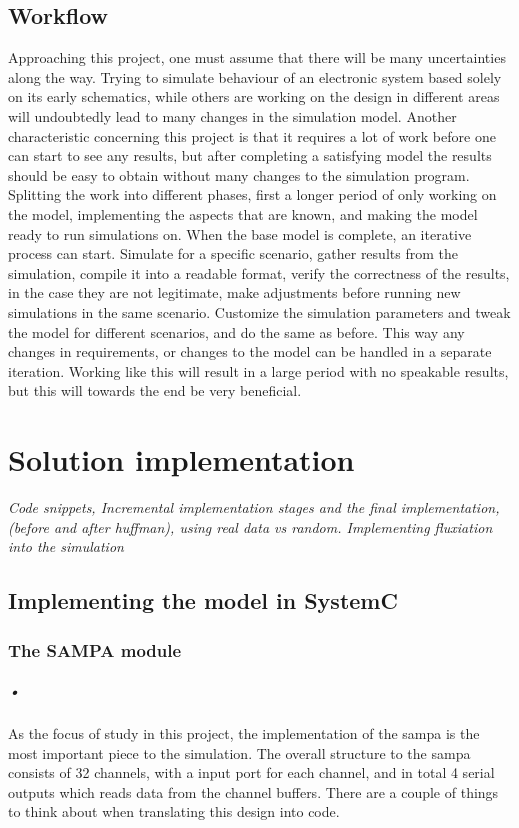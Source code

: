 \documentclass[a4paper, 12pt]{report}
\begin{document}
\section{Workflow}
Approaching this project, one must assume that there will be many uncertainties along the way.
Trying to simulate behaviour of an electronic system based solely on its early schematics, while others are working on the design in different areas will undoubtedly lead to many changes in the simulation model.
Another characteristic concerning this project is that it requires a lot of work before one can start to see any results, but after completing a satisfying  model the results should be easy to obtain without many changes to the simulation program.
Splitting the work into different phases, first a longer period of only working on the model, implementing the aspects that are known, and making the model ready to run simulations on.
When the base model is complete, an iterative process can start.
Simulate for a specific scenario, gather results from the simulation, compile it into a readable format, verify the correctness of the results, in the case they are not legitimate, make adjustments before running new simulations in the same scenario.
Customize the simulation parameters and tweak the model for different scenarios, and do the same as before.
This way any changes in requirements, or changes to the model can be handled in a separate iteration.
Working like this will result in a large period with no speakable results, but this will towards the end be very beneficial.

\chapter{Solution implementation}
\textit{Code snippets, Incremental implementation stages and the final implementation, (before and after huffman), using real data vs random. Implementing fluxiation into the simulation}
\section{Implementing the model in SystemC}
\subsection{The SAMPA module}

\paragraph{•}
As the focus of study in this project, the implementation of the \gls{sampa} is the most important piece to the simulation.
The overall structure to the \gls{sampa} consists of 32 channels, with a input port for each channel, and in total 4 serial outputs which reads data from the channel buffers.
There are a couple of things to think about when translating this design into code.
\end{document}
